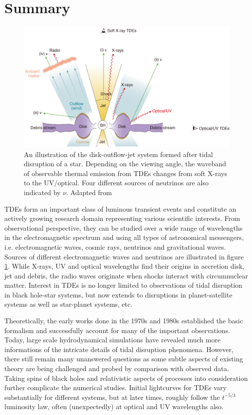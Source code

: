 \documentclass{tda}
\begin{document}
\section{Summary} \label{summary}

\begin{figure}
	\centering
	\captionsetup{width=.85\linewidth}
	\includegraphics[width=.7\linewidth, height=.3\linewidth]{./images/hayasaki2021.png}
	\caption{An illustration of the disk-outflow-jet system formed after tidal disruption of a star. Depending on the viewing angle, the
waveband of observable thermal emission from TDEs changes from soft X-rays to the UV/optical. Four different sources of neutrinos are also indicated by \(\nu\). Adapted from \cite{hayasaki_neutrinos_2021}}
	\label{fig:em_neutrino_sources}
\end{figure}

TDEs form an important class of luminous transient events and constitute an actively growing research domain representing various scientific interests. From observational perspective, they can be studied over a wide range of wavelengths in the electromagnetic spectrum and using all types of astronomical messengers, i.e. electromagnetic waves, cosmic rays, neutrinos and gravitational waves. Sources of different electromagnetic waves and neutrinos are illustrated in figure \ref{fig:em_neutrino_sources}. While X-rays, UV and optical wavelengths find their origins in accretion disk, jet and debris, the radio waves originate when shocks interact with circumnuclear matter. Interest in TDEs is no longer limited to observations of tidal disruption in black hole-star systems, but now extends to disruptions in planet-satellite systems as well as star-planet systems, etc.

Theoretically, the early works done in the 1970s and 1980s established the basic formalism and successfully account for many of the important observations. Today, large scale hydrodynamical simulations have revealed much more informations of the intricate details of tidal disruption phenomena. However, there still remain many unanswered questions as some subtle aspects of existing theory are being challenged and probed by comparison with observed data. Taking spins of black holes and relativistic aspects of processes into consideration further complicate the numerical studies. Initial lightcurves for TDEs vary substantially for different systems, but at later times, roughly follow the \(t^{-5/3}\) luminosity law, often (unexpectedly) at optical and UV wavelengths also.
\end{document}
